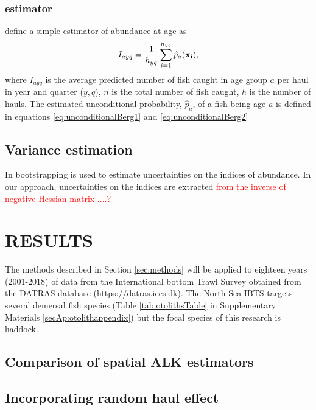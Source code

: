 \documentclass[a4paper 12pt]{article}
\numberwithin{equation}{section}
\newcommand{\ed}[1]{\textcolor{red}{#1}}
\begin{document}
\subsubsection{\citet{berg2012spatial} estimator}
\label{sec:BergIndex}

\citet{berg2012spatial} define a simple estimator of abundance at age as
\begin{equation}
I_{ayq} = \frac{1}{h_{yq}} \sum_{i=1}^{n_{yq}}\hat{p}_{a} (\bf x_{i}),
\label{eq:bergIndex}
\end{equation}
where $I_{ayq}$ is the average predicted number of fish caught in age group $a$ per haul in year and quarter ($y,q$), $n$ is the total number of fish caught, $h$ is the number of hauls. The estimated unconditional probability, $\hat{p}_{a}$, of a fish being age $a$ is defined in equations \ref{eq:unconditionalBerg1} and \ref{eq:unconditionalBerg2}


\subsection{\large Variance estimation}
In \citet{berg2012spatial} bootstrapping is used to estimate uncertainties on the indices of abundance. In our approach, uncertainties on the indices are extracted \ed{from the inverse of negative Hessian matrix ....?}

\section{RESULTS}
\label{sec:results}

The methods described in Section \ref{sec:methods} will be applied to eighteen years  (2001-2018) of data from the International bottom Trawl Survey obtained from the DATRAS database  (\href{https://datras.ices.dk}{https://datras.ices.dk}). The North Sea IBTS targets several demersal fish species (Table \ref{tab:otolithsTable} in Supplementary Materials \ref{secAp:otolithappendix}) but the focal species of this research is haddock.


\clearpage



\subsection{Comparison of spatial ALK estimators}

\clearpage
\subsection{Incorporating random haul effect}
\end{document}
